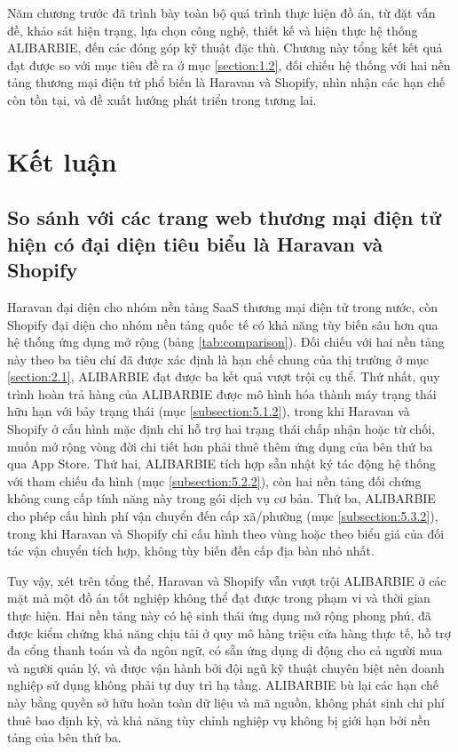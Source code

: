 \documentclass[../DoAn.tex]{subfiles}
\begin{document}
Năm chương trước đã trình bày toàn bộ quá trình thực hiện đồ án, từ đặt vấn
đề, khảo sát hiện trạng, lựa chọn công nghệ, thiết kế và hiện thực hệ thống
\break ALIBARBIE, đến các đóng góp kỹ thuật đặc thù. Chương này tổng kết kết quả đạt
được so với mục tiêu đề ra ở mục \ref{section:1.2}, đối chiếu hệ thống với hai
nền tảng thương mại điện tử phổ biến là Haravan và Shopify, nhìn nhận các hạn
chế còn tồn tại, và đề xuất hướng phát triển trong tương lai.

\section{Kết luận}
\label{section:6.1}

\subsection*{So sánh với các trang web thương mại điện tử hiện có đại diện tiêu biểu là  Haravan và Shopify}

Haravan đại diện cho nhóm nền tảng SaaS thương mại điện tử trong nước, còn
Shopify đại diện cho nhóm nền tảng quốc tế có khả năng tùy biến sâu hơn qua hệ
thống ứng dụng mở rộng (bảng \ref{tab:comparison}). Đối chiếu với hai nền tảng
này theo ba tiêu chí đã được xác định là hạn chế chung của thị trường ở mục
\ref{section:2.1}, ALIBARBIE đạt được ba kết quả vượt trội cụ thể. Thứ nhất,
quy trình hoàn trả hàng của ALIBARBIE được mô hình hóa thành máy trạng thái
hữu hạn với bảy trạng thái (mục \ref{subsection:5.1.2}), trong khi Haravan và
Shopify ở cấu hình mặc định chỉ hỗ trợ hai trạng thái chấp nhận hoặc từ chối,
muốn mở rộng vòng đời chi tiết hơn phải thuê thêm ứng dụng của bên thứ ba qua
App Store. Thứ hai, ALIBARBIE tích hợp sẵn nhật ký tác động hệ thống với tham chiếu đa
hình (mục \ref{subsection:5.2.2}), còn hai nền tảng đối chứng không cung cấp
tính năng này trong gói dịch vụ cơ bản. Thứ ba, ALIBARBIE cho phép cấu hình
phí vận chuyển đến cấp xã/phường (mục \ref{subsection:5.3.2}), trong khi
Haravan và Shopify chỉ cấu hình theo vùng hoặc theo biểu giá của đối tác vận
chuyển tích hợp, không tùy biến đến cấp địa bàn nhỏ nhất.

Tuy vậy, xét trên tổng thể, Haravan và Shopify vẫn vượt trội ALIBARBIE ở các
mặt mà một đồ án tốt nghiệp không thể đạt được trong phạm vi và thời gian thực
hiện. Hai nền tảng này có hệ sinh thái ứng dụng mở rộng phong phú, đã được
kiểm chứng khả năng chịu tải ở quy mô hàng triệu cửa hàng thực tế, hỗ trợ đa
cổng thanh toán và đa ngôn ngữ, có sẵn ứng dụng di động cho cả người mua và
người quản lý, và được vận hành bởi đội ngũ kỹ thuật chuyên biệt nên doanh
nghiệp sử dụng không phải tự duy trì hạ tầng. ALIBARBIE bù lại các hạn chế này
bằng quyền sở hữu hoàn toàn dữ liệu và mã nguồn, không phát sinh chi phí thuê
bao định kỳ, và khả năng tùy chỉnh nghiệp vụ không bị giới hạn bởi nền tảng
của bên thứ ba.
\end{document}
